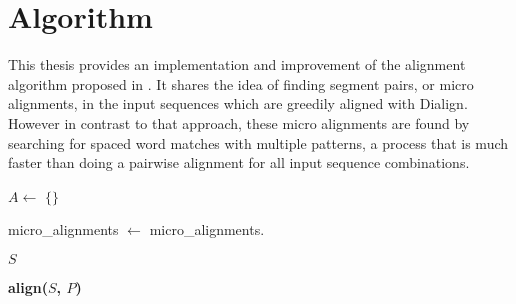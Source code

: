 \chapter{Algorithm}
\label{chap:algorithm}
This thesis provides an implementation and improvement of the alignment algorithm proposed in \cite{hundt2020praktkium}. It shares the idea of finding segment pairs, or micro alignments, in the input sequences which are greedily aligned with Dialign. However in contrast to that approach, these micro alignments are found by searching for spaced word matches with multiple patterns, a process that is much faster than doing a pairwise alignment for all input sequence combinations. 


\begin{algorithm}[h]
	\DontPrintSemicolon
	
	
	$A \leftarrow$ $\{\}$\;
	
	micro\_alignments $\leftarrow$ \;
	micro\_alignments.\sort{}\;
	
	\;
	\Return $S$\;
	
	\caption{\bf{align($S$, $P$)}}
	\label{alg:align}
\end{algorithm}

